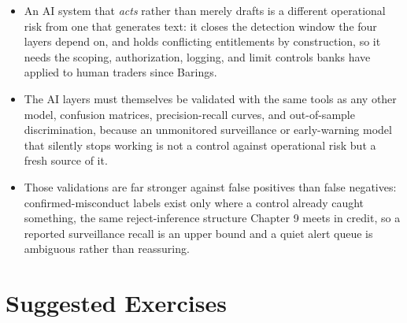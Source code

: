 \documentclass[../ai_in_finance]{subfiles}
\begin{document}
\begin{itemize}
\item An AI system that \emph{acts} rather than merely drafts is a different operational risk from one that generates text: it closes the detection window the four layers depend on, and holds conflicting entitlements by construction, so it needs the scoping, authorization, logging, and limit controls banks have applied to human traders since Barings.
\item The AI layers must themselves be validated with the same tools as any other model, confusion matrices, precision-recall curves, and out-of-sample discrimination, because an unmonitored surveillance or early-warning model that silently stops working is not a control against operational risk but a fresh source of it.
\item Those validations are far stronger against false positives than false negatives: confirmed-misconduct labels exist only where a control already caught something, the same reject-inference structure Chapter 9 meets in credit, so a reported surveillance recall is an upper bound and a quiet alert queue is ambiguous rather than reassuring.
\end{itemize}

\section{Suggested Exercises}
\end{document}
